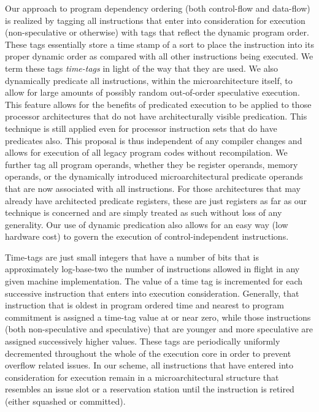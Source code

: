 \documentclass[10pt,dvips]{article}
\begin{document}
Our approach to program dependency ordering (both control-flow
and data-flow) is realized by tagging all instructions that
enter into consideration for execution (non-speculative or otherwise)
with tags that reflect the dynamic program order.
These tags essentially store a time stamp of a sort to place the
instruction into its proper dynamic order as compared with all other
instructions being executed.  We term these tags \textit{time-tags}
in light of the way that they are used.
We also dynamically predicate all instructions, within the microarchitecture
itself, to allow for large amounts of possibly random out-of-order
speculative execution.
This feature allows for the benefits of predicated execution to be
applied to those processor
architectures that do not have architecturally visible predication.
This technique is still applied even for processor instruction
sets that do have predicates also.  This proposal is thus independent
of any compiler changes and allows for execution of all legacy program
codes without recompilation.
We further tag all program operands, whether they be register operands,
memory operands, or the dynamically introduced microarchitectural
predicate operands that are now associated with all instructions.
For those architectures that may already have architected predicate
registers, these are just registers as far as our technique is concerned
and are simply treated as such without loss of any generality.
Our use of dynamic predication also allows for an easy way (low hardware
cost) to
govern the execution of control-independent instructions.

Time-tags are just small integers that have a number of bits that is
approximately log-base-two the number of instructions allowed
in flight in any given machine implementation.
The value of a time tag is incremented for each successive instruction
that enters into execution consideration.  
Generally, that
instruction that is oldest in program ordered time and nearest to
program commitment is assigned
a time-tag value at or near zero, while those instructions (both
non-speculative and speculative) that are younger and more speculative
are assigned successively higher values.
These tags are periodically
uniformly decremented throughout the whole of the execution core
in order to prevent overflow related issues.  
In our scheme, all instructions that have entered into consideration
for execution remain in a microarchitectural structure that resembles
an issue slot or a reservation station until the instruction is
retired (either squashed or committed).
\end{document}
